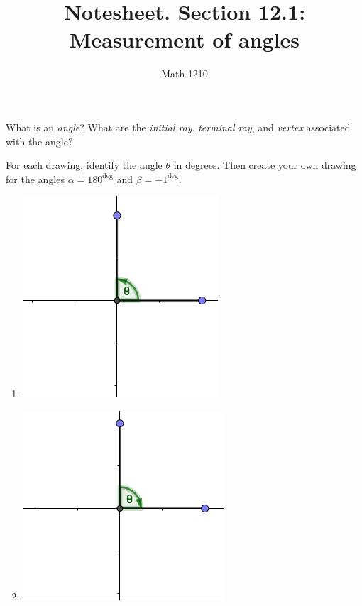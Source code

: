 \documentclass[12pt, a4paper]{article}
\author{Math 1210}
\title{Notesheet. Section 12.1: Measurement of angles}
\date{}
\begin{document}
\maketitle
\nameline
\begin{defi}
  What is an \emph{angle}?  What are the \emph{initial ray}, \emph{terminal ray}, and \emph{vertex} associated with the angle?
\end{defi}
\vs\vs
\begin{ex}
  For each drawing, identify the angle $\theta$ in degrees.  Then
  create your own drawing for the angles $\alpha = 180^\deg$ and
  $\beta = -1^\deg$.\\
  \begin{minipage}{0.5\linewidth}
  \begin{enumerate}
    \item \includegraphics[scale=0.40]{images/angle-1-digital}
    \item \includegraphics[scale=0.40]{images/angle-2-digital}
  \end{enumerate}  
  \end{minipage}
  \begin{minipage}{0.5\linewidth}

\end{minipage}
\end{ex}
\end{document}
